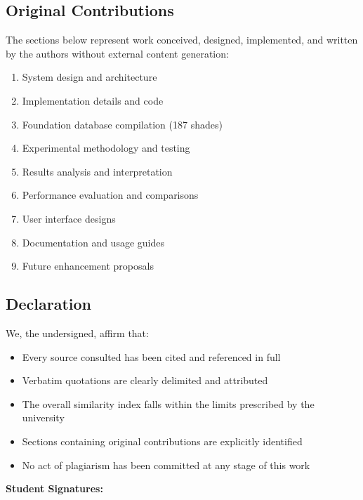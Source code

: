 \subsection{Original Contributions}

The sections below represent work conceived, designed, implemented, and written by the authors without external content generation:

\begin{enumerate}
    \item System design and architecture
    \item Implementation details and code
    \item Foundation database compilation (187 shades)
    \item Experimental methodology and testing
    \item Results analysis and interpretation
    \item Performance evaluation and comparisons
    \item User interface designs
    \item Documentation and usage guides
    \item Future enhancement proposals
\end{enumerate}

\subsection{Declaration}

We, the undersigned, affirm that:

\begin{itemize}
    \item Every source consulted has been cited and referenced in full
    \item Verbatim quotations are clearly delimited and attributed
    \item The overall similarity index falls within the limits prescribed by the university
    \item Sections containing original contributions are explicitly identified
    \item No act of plagiarism has been committed at any stage of this work
\end{itemize}

\vspace{1cm}

\textbf{Student Signatures:}

\vspace{0.5cm}

